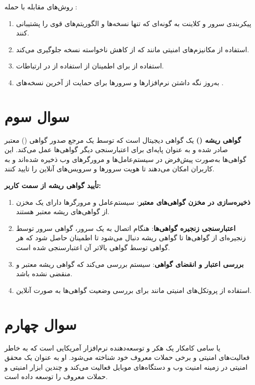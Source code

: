 \documentclass{report}
\begin{document}
روش‌های مقابله با حمله :
\begin{enumerate}
	\item 
	پیکربندی سرور و کلاینت به گونه‌ای که تنها نسخه‌ها و الگوریتم‌های قوی را پشتیبانی کنند.
	\item 
	استفاده از مکانیزم‌های امنیتی مانند  که از کاهش ناخواسته نسخه جلوگیری می‌کند.
	\item 
	استفاده از  برای اطمینان از استفاده از  در ارتباطات.
	\item
	به‌روز نگه داشتن نرم‌افزارها و سرورها برای حمایت از آخرین نسخه‌های .
\end{enumerate}

\section{سوال سوم}

\textbf{گواهی ریشه ()}
یک گواهی دیجیتال است که توسط یک مرجع صدور گواهی () معتبر صادر شده و به عنوان پایه‌ای برای اعتبارسنجی دیگر گواهی‌ها عمل می‌کند. این گواهی‌ها به‌صورت پیش‌فرض در سیستم‌عامل‌ها و مرورگرهای وب ذخیره شده‌اند و به کاربران امکان می‌دهند تا هویت سرورها و سرویس‌های آنلاین را تایید کنند.

\textbf{تأیید گواهی ریشه از سمت کاربر:}
\begin{enumerate}
	\item \textbf{ذخیره‌سازی در مخزن گواهی‌های معتبر}:
	 سیستم‌عامل و مرورگرها دارای یک مخزن از گواهی‌های ریشه معتبر هستند.
	\item \textbf{اعتبارسنجی زنجیره گواهی‌ها}:
	 هنگام اتصال به یک سرور، گواهی سرور توسط زنجیره‌ای از گواهی‌ها تا گواهی ریشه دنبال می‌شود تا اطمینان حاصل شود که هر گواهی توسط گواهی بالاتر آن اعتبارسنجی شده است.
	\item \textbf{بررسی اعتبار و انقضای گواهی}:
	 سیستم بررسی می‌کند که گواهی ریشه معتبر و منقضی نشده باشد.
	\item
	استفاده از پروتکل‌های امنیتی مانند  برای بررسی وضعیت گواهی‌ها به صورت آنلاین.
\end{enumerate}

\section{سوال چهارم}

\textbf{}
یا سامی کامکار یک هکر و توسعه‌دهنده نرم‌افزار آمریکایی است که به خاطر فعالیت‌های امنیتی و برخی حملات معروف خود شناخته می‌شود. او به عنوان یک محقق امنیتی در زمینه امنیت وب و دستگاه‌های موبایل فعالیت می‌کند و چندین ابزار امنیتی و حملات معروف را توسعه داده است.
\end{document}
